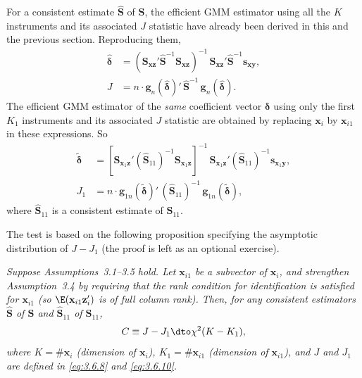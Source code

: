 For a consistent estimate $\hat{\mathbf{S}}$ of $\mathbf{S}$, the efficient GMM estimator using all the $K$
instruments and its associated $J$ statistic have already been derived in this and the
previous section.  Reproducing them,
\begin{align}
  \hat{\boldsymbol{\delta}}
  &= (\mathbf{S}_{\mathbf{xz}}' \hat{\mathbf{S}}^{-1} \mathbf{S}_{\mathbf{xz}})^{-1}\,
     \mathbf{S}_{\mathbf{xz}}' \hat{\mathbf{S}}^{-1} \mathbf{s}_{\mathbf{xy}},
  \label{eq:3.6.7} \\
  J &= n \cdot \mathbf{g}_n(\hat{\boldsymbol{\delta}})'\,
     \hat{\mathbf{S}}^{-1}\, \mathbf{g}_n(\hat{\boldsymbol{\delta}}).
  \label{eq:3.6.8}
\end{align}
The efficient GMM estimator of the \emph{same} coefficient vector $\boldsymbol{\delta}$ using only the first
$K_1$ instruments and its associated $J$ statistic are obtained by replacing $\mathbf{x}_i$ by
$\mathbf{x}_{i1}$ in these expressions.  So
\begin{align}
  \tilde{\boldsymbol{\delta}}
  &= [\mathbf{S}_{\mathbf{x}_1 \mathbf{z}}'
     (\hat{\mathbf{S}}_{11})^{-1}
     \mathbf{S}_{\mathbf{x}_1 \mathbf{z}}]^{-1}\,
     \mathbf{S}_{\mathbf{x}_1 \mathbf{z}}'
     (\hat{\mathbf{S}}_{11})^{-1}
     \mathbf{s}_{\mathbf{x}_1 \mathbf{y}},
  \label{eq:3.6.9} \\
  J_1 &= n \cdot \mathbf{g}_{1n}(\tilde{\boldsymbol{\delta}})'\,
     (\hat{\mathbf{S}}_{11})^{-1}\,
     \mathbf{g}_{1n}(\tilde{\boldsymbol{\delta}}),
  \label{eq:3.6.10}
\end{align}
where $\hat{\mathbf{S}}_{11}$ is a consistent estimate of $\mathbf{S}_{11}$.

The test is based on the following proposition specifying the asymptotic distribution
of $J - J_1$ (the proof is left as an optional exercise).

\begin{proposition}
\label{prop:3.7}
\emph{Suppose Assumptions~3.1--3.5 hold.  Let $\mathbf{x}_{i1}$ be a subvector of $\mathbf{x}_i$, and
strengthen Assumption~3.4 by requiring that the rank condition for identification is
satisfied for $\mathbf{x}_{i1}$ (so $\E(\mathbf{x}_{i1} \mathbf{z}_i')$ is of full column rank).  Then,
for any consistent estimators $\hat{\mathbf{S}}$ of $\mathbf{S}$ and $\hat{\mathbf{S}}_{11}$ of
$\mathbf{S}_{11}$,}
\[
  C \equiv J - J_1 \dto \chi^2(K - K_1),
\]
\emph{where $K = \#\mathbf{x}_i$ (dimension of $\mathbf{x}_i$),
$K_1 = \#\mathbf{x}_{i1}$ (dimension of $\mathbf{x}_{i1}$), and $J$ and $J_1$ are defined in
\eqref{eq:3.6.8} and \eqref{eq:3.6.10}.}
\end{proposition}

